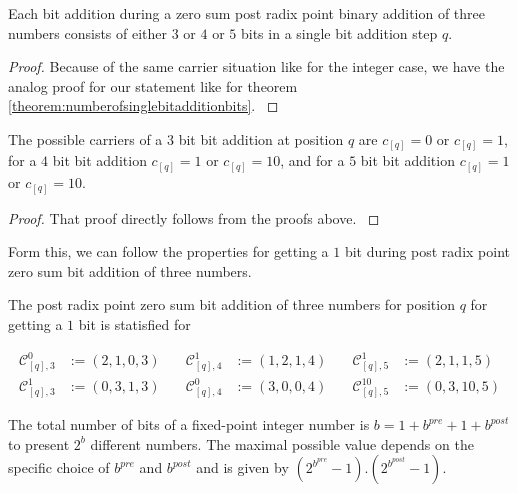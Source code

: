 \begin{theorem}
    Each bit addition during a zero sum post radix point binary addition of three numbers consists of either $3$ or $4$ or $5$ bits in a single bit addition step $q$.
\label{theorem:numberofsinglebitadditionbits_fixedpointinteger}
\end{theorem}

\begin{proof}
    Because of the same carrier situation like for the integer case, we have the analog proof for our statement like for theorem \ref{theorem:numberofsinglebitadditionbits}.
\label{proof:numberofsinglebitadditionbits_fixedpointinteger}
\end{proof}


\begin{theorem}
    The possible carriers of a $3$ bit bit addition at position $q$ are $c_{[q]} = 0$ or $c_{[q]} = 1$, for a $4$ bit bit addition $c_{[q]} = 1$ or $c_{[q]} = 10$, and for a $5$ bit bit addition $c_{[q]} = 1$ or $c_{[q]} = 10$.
\label{theorem:carriersfor34and5bitbitadditions_fixedpointinteger}
\end{theorem}

\begin{proof}
    That proof directly follows from the proofs above.
\label{proof:carriersfor34and5bitbitadditions_fixedpointinteger}
\end{proof}

Form this, we can follow the properties for getting a $1$ bit during post radix point zero sum bit addition of three numbers.

\begin{definition}
    
    The post radix point zero sum bit addition of three numbers for position $q$ for getting a $1$ bit is statisfied for

    \begin{equation}
        \begin{aligned}
                \mathcal{C}^{0}_{[q],3} &:= \left(2, 1, 0, 3\right) \quad & \mathcal{C}^{1}_{[q],4} &:= \left(1, 2, 1, 4\right) \quad & \mathcal{C}^{1}_{[q],5} &:= \left(2, 1, 1, 5\right)\\
                \mathcal{C}^{1}_{[q],3} &:= \left(0, 3, 1, 3\right) \quad & \mathcal{C}^{0}_{[q],4} &:= \left(3, 0, 0, 4\right) \quad & \mathcal{C}^{10}_{[q],5} &:= \left(0, 3, 10, 5\right)
            \label{eq:zerosumbitadditionproperties_fixedpointinteger}
        \end{aligned}
    \end{equation}

\label{def:zerosumbitadditionproperties_fixedpointinteger}
\end{definition}

The total number of bits of a fixed-point integer number is $b = 1 + b^{pre} + 1 + b^{post}$ to present $2^{b}$ different numbers. The maximal possible value depends on the specific choice of $b^{pre}$ and $b^{post}$ and is given by $\left(2^{b^{pre}}-1\right).\left(2^{b^{post}} - 1\right)$.
